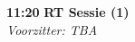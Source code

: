 \documentclass[a4paper,10pt]{report}
\begin{document}
\begin{multicols*}{3}

\begin{packed_enum}
\item[\textbf{11:20}]{\textbf{RT Sessie (1)}}\\\textit{Voorzitter: TBA}
\end{packed_enum}


\end{multicols*}
\end{document}

